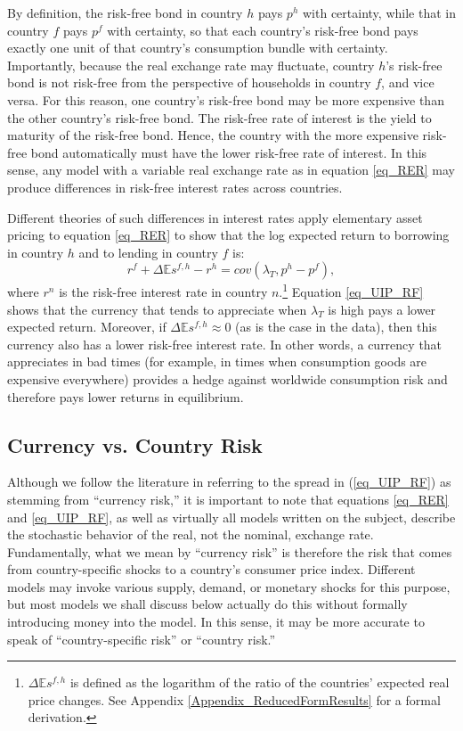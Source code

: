 \documentclass{ar-1col}
\begin{document}
By definition, the risk-free bond in country $h$ pays $p^h$ with certainty, while that in country $f$ pays $p^f$ with certainty, so that each country's risk-free bond pays exactly one unit of that country's consumption bundle with certainty. Importantly, because the real exchange rate may fluctuate, country $h$'s risk-free bond is not risk-free from the perspective of households in country $f$, and vice versa. For this reason, one country's risk-free bond may be more expensive than the other country's risk-free bond. The risk-free rate of interest is the yield to maturity of the risk-free bond.  Hence, the country with the more expensive risk-free bond automatically must have the lower risk-free rate of interest. In this sense, any model with a variable real exchange rate as in equation \ref{eq_RER} may produce differences in risk-free interest rates across countries.

Different theories of such differences in interest rates apply elementary asset pricing to equation \ref{eq_RER} to show that the log expected return to borrowing in country $h$ and to lending in country $f$ is:
\begin{equation}
  r^{f} + \Delta \mathbb{E} s^{f,h} - r^{h} 
  = cov \left( \lambda _{T}, p^{h}-p^{f}\right),
  \label{eq_UIP_RF}
\end{equation}%
where $r^{n}$ is the risk-free interest rate in country $n$.\footnote{$\Delta \mathbb{E} s^{f,h}$ is defined as the logarithm of the ratio of the countries' expected real price changes. See Appendix \ref{Appendix_ReducedFormResults} for a formal derivation.} Equation \ref{eq_UIP_RF} shows that the currency that tends to appreciate when $\lambda_T$ is high pays a lower expected return. Moreover, if $\Delta \mathbb{E} s^{f,h}\approx0$ (as is the case in the data), then this currency also has a lower risk-free interest rate. In other words, a currency that appreciates in bad times (for example, in times when consumption goods are expensive everywhere) provides a hedge against worldwide consumption risk and therefore pays lower returns in equilibrium.

\begin{textbox}[]
\section{Currency vs. Country Risk}
Although we follow the literature in referring to the spread in (\ref{eq_UIP_RF}) as stemming from ``currency risk,'' it is important to note that equations \ref{eq_RER} and \ref{eq_UIP_RF}, as well as virtually all models written on the subject, describe the stochastic behavior of the real, not the nominal, exchange rate. Fundamentally, what we mean by ``currency risk'' is therefore the risk that comes from country-specific shocks to a country's consumer price index. Different models may invoke various supply, demand, or monetary shocks for this purpose, but most models we shall discuss below actually do this without formally introducing money into the model. In this sense, it may be more accurate to speak of ``country-specific risk'' or ``country risk.'' 
\end{textbox}
\end{document}
